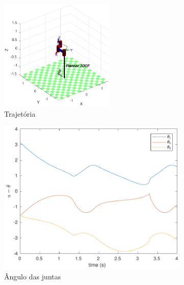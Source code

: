 \documentclass[a4paper,11pt]{article}
\theoremstyle{mytheor}
\begin{document}
\begin{figure}[!ht]
\centering
  \begin{minipage}{\linewidth}
  \centering
    \begin{subfigure}[b]{1\textwidth}
    \centering
    \includegraphics[width=0.6\textwidth]{figs/ex2_2b_traj.pdf}
    \caption{Trajetória}
    \label{fig:ex2_2b_traj}
    \end{subfigure}
  \end{minipage}
  \begin{minipage}{\linewidth}
  \centering
    \begin{subfigure}[b]{0.49\textwidth}
    \includegraphics[width=1\textwidth]{figs/ex2_2b_q.pdf}
    \caption{Ângulo das juntas}
    \label{fig:ex2_2b_q}
    \end{subfigure}
    \begin{subfigure}[b]{0.49\textwidth}

\end{subfigure}
\end{minipage}
\end{figure}
\end{document}
